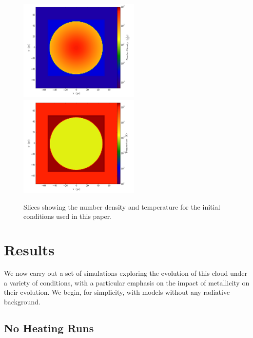 \documentclass[useAMS,usenatbib]{mn2e}
\begin{document}
\begin{figure}
\begin{center}
\includegraphics[width=6cm]{Images/Initial_number_density}
\includegraphics[width=6cm]{Images/Initial_temperature}
\end{center}
\caption{\label{fig:initial_setup} Slices showing the number density and temperature 
for the initial conditions used in this paper. }
\end{figure}

% 
\section{Results}
\label{sec:results}

We now carry out a set of simulations exploring the evolution of this cloud under a variety of conditions, with a particular emphasis on the impact of metallicity on their evolution.  We begin, for simplicity, with models without any radiative background.

\subsection{No Heating Runs}
\end{document}
